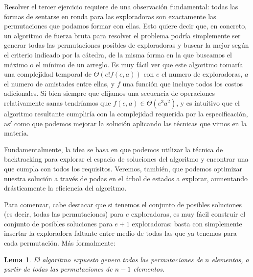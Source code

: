 \documentclass{article}
\newtheorem{lemma}{Lema}[theorem]
\theoremstyle{definition}
\theoremstyle{remark}
\begin{document}
Resolver el tercer ejercicio requiere de una observación fundamental: todas las formas de sentarse en ronda para las exploradoras son exactamente las permutaciones que podamos formar con ellas. Esto quiere decir que, en concreto, un algoritmo de fuerza bruta para resolver el problema podría simplemente ser generar todas las permutaciones posibles de exploradoras y buscar la mejor según el criterio indicado por la cátedra, de la misma forma en la que buscamos el máximo o el mínimo de un arreglo. Es muy fácil ver que este algoritmo tomaría una complejidad temporal de $\Theta(e! f(e, a))$ con $e$ el numero de exploradoras, $a$ el numero de amistades entre ellas, y $f$ una función que incluye todos los costos adicionales. Si bien siempre que elijamos una secuencia de operaciones relativamente sanas tendríamos que $f(e, a) \in \Theta(e^3 a^2)$, y es intuitivo que el algoritmo resultante cumpliría con la complejidad requerida por la especificación, así como que podemos mejorar la solución aplicando las técnicas que vimos en la materia.

Fundamentalmente, la idea se basa en que podemos utilizar la técnica de backtracking para explorar el espacio de soluciones del algoritmo y encontrar una que cumpla con todos los requisitos. Veremos, también, que podemos optimizar nuestra solución a través de podas en el árbol de estados a explorar, aumentando drásticamente la eficiencia del algoritmo.

Para comenzar, cabe destacar que si tenemos el conjunto de posibles soluciones (es decir, todas las permutaciones) para $e$ exploradoras, es muy fácil construir el conjunto de posibles soluciones para $e+1$ exploradoras: basta con simplemente insertar la exploradora faltante entre medio de todas las que ya tenemos para cada permutación. Más formalmente:

\begin{lemma}
El algoritmo expuesto genera todas las permutaciones de $n$ elementos, a partir de todas las permutaciones de $n-1$ elementos.
\end{lemma}
\end{document}
